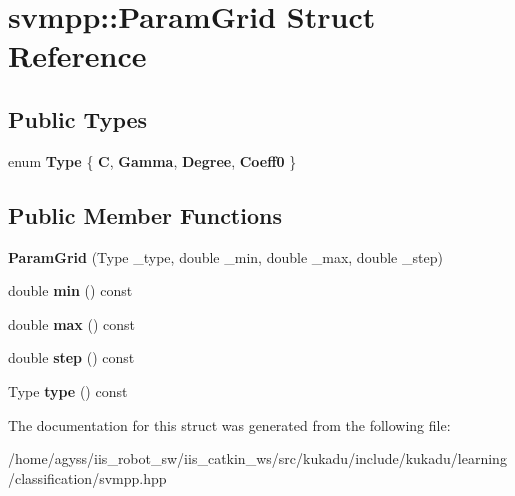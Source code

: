 \hypertarget{structsvmpp_1_1ParamGrid}{}\section{svmpp\+:\+:Param\+Grid Struct Reference}
\label{structsvmpp_1_1ParamGrid}
\subsection*{Public Types}
\begin{DoxyCompactItemize}
\item 
enum {\bfseries Type} \{ {\bfseries C}, 
{\bfseries Gamma}, 
{\bfseries Degree}, 
{\bfseries Coeff0}
 \}\hypertarget{structsvmpp_1_1ParamGrid_a9620332077ae8cca96af68ebed1cfcc4}{}\label{structsvmpp_1_1ParamGrid_a9620332077ae8cca96af68ebed1cfcc4}

\end{DoxyCompactItemize}
\subsection*{Public Member Functions}
\begin{DoxyCompactItemize}
\item 
{\bfseries Param\+Grid} (Type \+\_\+type, double \+\_\+min, double \+\_\+max, double \+\_\+step)\hypertarget{structsvmpp_1_1ParamGrid_ae0de635ebeb30be64c97e0bb1341964a}{}\label{structsvmpp_1_1ParamGrid_ae0de635ebeb30be64c97e0bb1341964a}

\item 
double {\bfseries min} () const \hypertarget{structsvmpp_1_1ParamGrid_ae7ae2a46cb224210706ef726cbb2a95e}{}\label{structsvmpp_1_1ParamGrid_ae7ae2a46cb224210706ef726cbb2a95e}

\item 
double {\bfseries max} () const \hypertarget{structsvmpp_1_1ParamGrid_ab141e78dbff704b956abdc5f80df1ea0}{}\label{structsvmpp_1_1ParamGrid_ab141e78dbff704b956abdc5f80df1ea0}

\item 
double {\bfseries step} () const \hypertarget{structsvmpp_1_1ParamGrid_a029f7ab2234abf44e4d94ff358aad7ab}{}\label{structsvmpp_1_1ParamGrid_a029f7ab2234abf44e4d94ff358aad7ab}

\item 
Type {\bfseries type} () const \hypertarget{structsvmpp_1_1ParamGrid_a4ad928ad90af5d725e77427a0b984074}{}\label{structsvmpp_1_1ParamGrid_a4ad928ad90af5d725e77427a0b984074}

\end{DoxyCompactItemize}


The documentation for this struct was generated from the following file\+:\begin{DoxyCompactItemize}
\item 
/home/agyss/iis\+\_\+robot\+\_\+sw/iis\+\_\+catkin\+\_\+ws/src/kukadu/include/kukadu/learning/classification/svmpp.\+hpp\end{DoxyCompactItemize}
